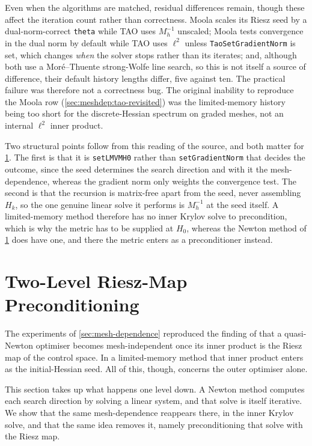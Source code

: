 \documentclass[a4paper,11pt]{article}
\theoremstyle{spacedplain} \newtheorem{theorem}[counter]{Theorem} \newtheorem{lemma}[counter]{Lemma} \newtheorem{prop}[counter]{Proposition} \newtheorem{cor}[counter]{Corollary}
\theoremstyle{spaceddefinition} \newtheorem{defn}[counter]{Definition} \newtheorem{example}[counter]{Example} \newtheorem{remark}[counter]{Remark}
\begin{document}
Even when the algorithms are matched, residual differences remain, though these affect the iteration count rather than correctness. Moola scales its Riesz seed by a dual-norm-correct \texttt{theta} while TAO uses $M_h^{-1}$ unscaled; Moola tests convergence in the dual norm by default while TAO uses $\ell^{2}$ unless \texttt{TaoSetGradientNorm} is set, which changes \emph{when} the solver stops rather than its iterates; and, although both use a Mor\'e--Thuente strong-Wolfe line search, so this is not itself a source of difference, their default history lengths differ, five against ten. The practical failure was therefore not a correctness bug. The original inability to reproduce the Moola row (\cref{sec:meshdep:tao-revisited}) was the limited-memory history being too short for the discrete-Hessian spectrum on graded meshes, not an internal $\ell^{2}$ inner product.

Two structural points follow from this reading of the source, and both matter for \cref{sec:precond}. The first is that it is \texttt{setLMVMH0} rather than \texttt{setGradientNorm} that decides the outcome, since the seed determines the search direction and with it the mesh-dependence, whereas the gradient norm only weights the convergence test. The second is that the recursion is matrix-free apart from the seed, never assembling $H_k$, so the one genuine linear solve it performs is $M_h^{-1}$ at the seed itself. A limited-memory method therefore has no inner Krylov solve to precondition, which is why the metric has to be supplied at $H_{0}$, whereas the Newton method of \cref{sec:precond} does have one, and there the metric enters as a preconditioner instead.

\section{Two-Level Riesz-Map Preconditioning}
\label{sec:precond}

The experiments of \cref{sec:mesh-dependence} reproduced the finding of \citet{shfp2017} that a quasi-Newton optimiser becomes mesh-independent once its inner product is the Riesz map of the control space. In a limited-memory method that inner product enters as the initial-Hessian seed. All of this, though, concerns the outer optimiser alone.

This section takes up what happens one level down. A Newton method computes each search direction by solving a linear system, and that solve is itself iterative. We show that the same mesh-dependence reappears there, in the inner Krylov solve, and that the same idea removes it, namely preconditioning that solve with the Riesz map.
\end{document}
